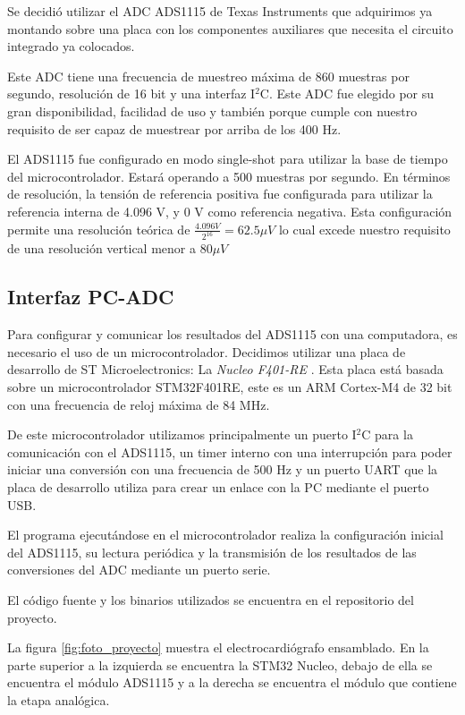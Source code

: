 \documentclass[conference]{IEEEtran}
\begin{document}
Se decidió utilizar el ADC ADS1115 de Texas Instruments \cite{ads1115} que adquirimos
ya montando sobre una placa con los componentes auxiliares que necesita el
circuito integrado ya colocados.

Este ADC tiene una frecuencia de muestreo máxima de 860 muestras por segundo, resolución
de 16 bit y una interfaz I$^2$C. Este ADC fue elegido por su gran disponibilidad,
facilidad de uso y también porque cumple con nuestro requisito de ser capaz de
muestrear por arriba de los 400 Hz.

El ADS1115 fue configurado en modo single-shot para utilizar la
base de tiempo del microcontrolador. Estará operando a 500 muestras por
segundo. En términos de resolución, la tensión de referencia positiva fue configurada
para utilizar la referencia interna de 4.096 V, y 0 V como referencia negativa.
Esta configuración permite una resolución teórica de $\frac{4.096 V}{2^{16}} = 
62.5 \mu V$ lo cual excede nuestro requisito de una resolución vertical menor a $80 \mu V$

\subsection{Interfaz PC-ADC}

Para configurar y comunicar los resultados del ADS1115 con una computadora, es
necesario el uso de un microcontrolador. Decidimos utilizar una placa de desarrollo 
de ST Microelectronics: La \textit{Nucleo F401-RE} \cite{nucleo}. Esta placa está
basada sobre un microcontrolador STM32F401RE, este es un ARM Cortex-M4 de 32 bit
con una frecuencia de reloj máxima de 84 MHz. 

De este microcontrolador utilizamos principalmente un puerto I$^2$C para la
comunicación con el ADS1115, un timer interno con una interrupción para poder
iniciar una conversión con una frecuencia de 500 Hz y un puerto UART que la placa
de desarrollo utiliza para crear un enlace con la PC mediante el puerto USB.

El programa ejecutándose en el microcontrolador realiza la configuración inicial del
ADS1115, su lectura periódica y la transmisión de los resultados de las conversiones
del ADC mediante un puerto serie.

El código fuente y los binarios utilizados se encuentra en el repositorio del
proyecto. \cite{repository} 

La figura \ref{fig:foto_proyecto} muestra el electrocardiógrafo ensamblado. En la
parte superior a la izquierda se encuentra la STM32 Nucleo, debajo de ella se
encuentra el módulo ADS1115 y a la derecha se encuentra el módulo que contiene
la etapa analógica.
\end{document}

